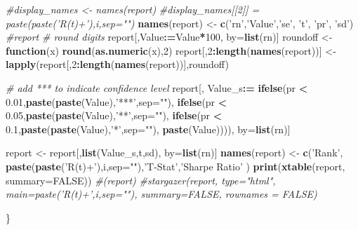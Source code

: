 \documentclass[
]{article}
\newenvironment{Shaded}{\begin{snugshade}}{\end{snugshade}}
\newcommand{\CommentTok}[1]{\textcolor[rgb]{0.56,0.35,0.01}{\textit{#1}}}
\newcommand{\ControlFlowTok}[1]{\textcolor[rgb]{0.13,0.29,0.53}{\textbf{#1}}}
\newcommand{\DataTypeTok}[1]{\textcolor[rgb]{0.13,0.29,0.53}{#1}}
\newcommand{\DecValTok}[1]{\textcolor[rgb]{0.00,0.00,0.81}{#1}}
\newcommand{\ErrorTok}[1]{\textcolor[rgb]{0.64,0.00,0.00}{\textbf{#1}}}
\newcommand{\FloatTok}[1]{\textcolor[rgb]{0.00,0.00,0.81}{#1}}
\newcommand{\KeywordTok}[1]{\textcolor[rgb]{0.13,0.29,0.53}{\textbf{#1}}}
\newcommand{\NormalTok}[1]{#1}
\newcommand{\OperatorTok}[1]{\textcolor[rgb]{0.81,0.36,0.00}{\textbf{#1}}}
\newcommand{\OtherTok}[1]{\textcolor[rgb]{0.56,0.35,0.01}{#1}}
\newcommand{\StringTok}[1]{\textcolor[rgb]{0.31,0.60,0.02}{#1}}
\begin{document}
\begin{Shaded}
\begin{Highlighting}[]
    \CommentTok{#display_names <- names(report)}
    \CommentTok{#display_names[[2]] = paste(paste('R(t)+'),i,sep="")}
    \KeywordTok{names}\NormalTok{(report) <-}\StringTok{ }\KeywordTok{c}\NormalTok{(}\StringTok{'rn'}\NormalTok{,}\StringTok{'Value'}\NormalTok{,}\StringTok{'se'}\NormalTok{, }\StringTok{'t'}\NormalTok{, }\StringTok{'pr'}\NormalTok{, }\StringTok{'sd'}\NormalTok{)}
    \CommentTok{#report}
    \CommentTok{# round digits}
\NormalTok{    report[,Value}\OperatorTok{:}\ErrorTok{=}\NormalTok{Value}\OperatorTok{*}\DecValTok{100}\NormalTok{, by=}\KeywordTok{list}\NormalTok{(rn)]}
\NormalTok{    roundoff <-}\StringTok{ }\ControlFlowTok{function}\NormalTok{(x) }\KeywordTok{round}\NormalTok{(}\KeywordTok{as.numeric}\NormalTok{(x),}\DecValTok{2}\NormalTok{)}
\NormalTok{    report[,}\DecValTok{2}\OperatorTok{:}\KeywordTok{length}\NormalTok{(}\KeywordTok{names}\NormalTok{(report))] <-}\StringTok{ }\KeywordTok{lapply}\NormalTok{(report[,}\DecValTok{2}\OperatorTok{:}\KeywordTok{length}\NormalTok{(}\KeywordTok{names}\NormalTok{(report))],roundoff)}
    
    \CommentTok{# add *** to indicate confidence level}
\NormalTok{    report[, Value_s}\OperatorTok{:}\ErrorTok{=}\StringTok{ }
\StringTok{             }\KeywordTok{ifelse}\NormalTok{(pr }\OperatorTok{<}\StringTok{ }\FloatTok{0.01}\NormalTok{,}\KeywordTok{paste}\NormalTok{(}\KeywordTok{paste}\NormalTok{(Value),}\StringTok{'***'}\NormalTok{,}\DataTypeTok{sep=}\StringTok{""}\NormalTok{), }
                    \KeywordTok{ifelse}\NormalTok{(pr }\OperatorTok{<}\StringTok{ }\FloatTok{0.05}\NormalTok{,}\KeywordTok{paste}\NormalTok{(}\KeywordTok{paste}\NormalTok{(Value),}\StringTok{'**'}\NormalTok{,}\DataTypeTok{sep=}\StringTok{""}\NormalTok{), }
                           \KeywordTok{ifelse}\NormalTok{(pr }\OperatorTok{<}\StringTok{ }\FloatTok{0.1}\NormalTok{,}\KeywordTok{paste}\NormalTok{(}\KeywordTok{paste}\NormalTok{(Value),}\StringTok{'*'}\NormalTok{,}\DataTypeTok{sep=}\StringTok{""}\NormalTok{), }\KeywordTok{paste}\NormalTok{(Value)))), by=}\KeywordTok{list}\NormalTok{(rn)]}
    
\NormalTok{    report <-}\StringTok{ }\NormalTok{report[,}\KeywordTok{list}\NormalTok{(Value_s,t,sd), by=}\KeywordTok{list}\NormalTok{(rn)]}
    \KeywordTok{names}\NormalTok{(report) <-}\StringTok{ }\KeywordTok{c}\NormalTok{(}\StringTok{'Rank'}\NormalTok{, }\KeywordTok{paste}\NormalTok{(}\KeywordTok{paste}\NormalTok{(}\StringTok{'R(t)+'}\NormalTok{),i,}\DataTypeTok{sep=}\StringTok{""}\NormalTok{),}\StringTok{'T-Stat'}\NormalTok{,}\StringTok{'Sharpe Ratio'}\NormalTok{ )}
    \KeywordTok{print}\NormalTok{(}\KeywordTok{xtable}\NormalTok{(report, }\DataTypeTok{summary=}\OtherTok{FALSE}\NormalTok{))}
    \CommentTok{#(report)}
    \CommentTok{#stargazer(report, type="html", main=paste('R(t)+',i,sep=""), summary=FALSE, rownames = FALSE)}

\NormalTok{\}}
\end{Highlighting}
\end{Shaded}
\end{document}
